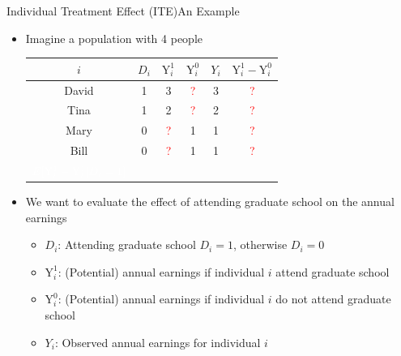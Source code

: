 \documentclass[hyperref={pdfpagelabels=false}]{beamer}
\begin{document}
\begin{frame}{Individual Treatment Effect (ITE)}{An Example}
\begin{itemize}
\item Imagine a population with 4 people
\vspace{0.2cm}
\begin{center}
	\begin{threeparttable}
		\centering\footnotesize
		\begin{tabular}{cccccc}
			\toprule
			$i$ & $D_{i}$ & $\mathrm{Y}^{1}_{i}$ & $\mathrm{Y}^{0}_{i}$ & $Y_{i}$ & $\mathrm{Y}^{1}_{i}-\mathrm{Y}^{0}_{i}$  \\
			\midrule
			David & 1 & 3 & \textcolor{red}? & 3 & \textcolor{red}? \\
			Tina & 1 & 2 & \textcolor{red}? & 2 & \textcolor{red}? \\
			Mary & 0 & \textcolor{red}? & 1 & 1 & \textcolor{red}? \\
			Bill & 0 & \textcolor{red}? & 1 & 1 & \textcolor{red}? \\
			\midrule
			$\color{white}E[\mathrm{Y}^{1}_{i}-\mathrm{Y}^{1}_{i}|D_i=1]$ &   &     &  &  &  \\
		\end{tabular}
	\end{threeparttable}
\end{center}


\item We want to evaluate the effect of attending graduate school on the annual earnings
\begin{itemize}
\vspace{0.2cm}
\item $D_{i}$: Attending graduate school $D_{i}=1$, otherwise $D_{i}=0$
\vspace{0.2cm}
\item $\mathrm{Y}^{1}_{i}$: (Potential) annual earnings if individual $i$ attend graduate school
\vspace{0.2cm}
\item $\mathrm{Y}^{0}_{i}$: (Potential) annual earnings if individual $i$ do not attend graduate school
\item $Y_{i}$: Observed annual earnings for individual $i$
\vspace{0.2cm}

\end{itemize}

\end{itemize}
\end{frame}
\end{document}
